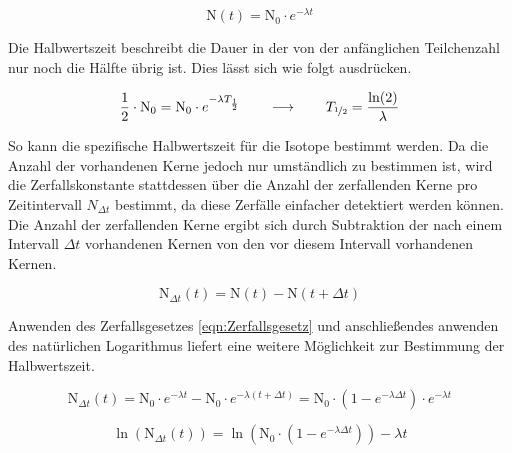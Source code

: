         \begin{equation}
            \text{N}(t) = \text{N}_0 \cdot e^{-\lambda t}
            \label{eqn:Zerfallsgesetz}
        \end{equation}

        \noindent
        Die Halbwertszeit beschreibt die Dauer in der von der anfänglichen Teilchenzahl nur noch die Hälfte übrig ist. Dies lässt sich wie folgt ausdrücken.

        \begin{equation}
            \frac{1}{2} \cdot \text{N}_0 = \text{N}_0 \cdot e^{-\lambda T_{\frac{1}{2}}} \qquad \longrightarrow \qquad T_{\nicefrac{1}{2}} = \frac{\ln(2)}{\lambda}
            \label{eqn:Halbwertszeit}
        \end{equation}

        \noindent
        So kann die spezifische Halbwertszeit für die Isotope bestimmt werden.
        Da die Anzahl der vorhandenen Kerne jedoch nur umständlich zu bestimmen ist, wird die Zerfallskonstante stattdessen über die Anzahl der zerfallenden Kerne pro Zeitintervall $N_{\Delta t}$
        bestimmt, da diese Zerfälle einfacher detektiert werden können. Die Anzahl der zerfallenden Kerne ergibt sich durch Subtraktion der nach einem Intervall $\Delta t$ vorhandenen Kernen von
        den vor diesem Intervall vorhandenen Kernen.

        \begin{equation*}
            \text{N}_{\Delta t}(t) = \text{N}(t) - \text{N}(t + \Delta t)
        \end{equation*}

        \noindent
        Anwenden des Zerfallsgesetzes \ref{eqn:Zerfallsgesetz} und anschließendes anwenden des natürlichen Logarithmus liefert eine weitere Möglichkeit zur Bestimmung der Halbwertszeit.
        
        \begin{equation}
            \text{N}_{\Delta t}(t) = \text{N}_0 \cdot e^{-\lambda t} - \text{N}_0 \cdot e^{-\lambda (t + \Delta t)} = \text{N}_0 \cdot \left(1 - e^{-\lambda \Delta t}\right) \cdot e^{-\lambda t}
            \label{eqn:Zerfallsgesetz_}
        \end{equation}
            
        \begin{equation}
            \ln\left(\text{N}_{\Delta t}(t)\right) = \ln \left(\text{N}_0 \cdot \left(1 - e^{-\lambda \Delta t}\right)\right) - \lambda t
            \label{eqn:theorieGerade}
        \end{equation}
        
